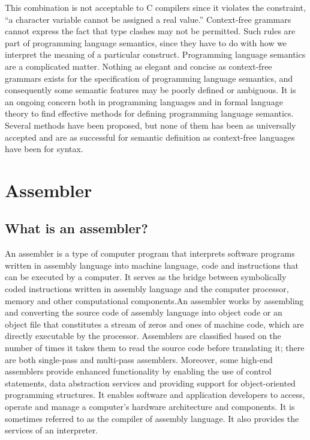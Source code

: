 \documentclass[a4paper,12pt]{extarticle}
\begin{document}
This combination is not acceptable to C compilers since it violates the constraint, “a
character variable cannot be assigned a real value.” Context-free grammars cannot
express the fact that type clashes may not be permitted. Such rules are part of
programming language semantics, since they have to do with how we interpret the
meaning of a particular construct. Programming language semantics are a complicated
matter. Nothing as elegant and concise as context-free grammars exists for
the specification of programming language semantics, and consequently some semantic
features may be poorly defined or ambiguous. It is an ongoing concern both
in programming languages and in formal language theory to find effective methods
for defining programming language semantics. Several methods have been proposed,
but none of them has been as universally accepted and are as successful for semantic
definition as context-free languages have been for syntax.
	\pagebreak
	\section{Assembler}
	\label{sec:assembler}
	\subsection{What is an assembler?}
	An assembler is a type of computer program that interprets software programs written in assembly language into machine language, code and instructions that can be executed by a computer. It serves as the bridge between symbolically coded instructions written in assembly language and the computer processor, memory and other computational components.\newline An assembler works by assembling and converting the source code of assembly language into object code or an object file that constitutes a stream of zeros and ones of machine code, which are directly executable by the processor. Assemblers are classified based on the number of times it takes them to read the source code before translating it; there are both single-pass and multi-pass assemblers. Moreover, some high-end assemblers provide enhanced functionality by enabling the use of control statements, data abstraction services and providing support for object-oriented programming structures. It enables software and application developers to access, operate and manage a computer's hardware architecture and components. It is sometimes referred to as the compiler of assembly language. It also provides the services of an interpreter.
\end{document}
